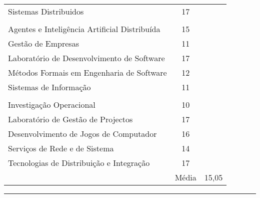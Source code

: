 \documentclass[a4paper,10pt]{article} %
\begin{document}
\begin{center}
\begin{tabular}{lcc}
Sistemas Distribuidos & 17\\ \\
Agentes e Inteligência Artificial Distribuída & 15\\
Gestão de Empresas & 11\\
Laboratório de Desenvolvimento de Software & 17\\
Métodos Formais em Engenharia de Software & 12\\
Sistemas de Informação & 11\\ \\
Investigação Operacional & 10\\
Laboratório de Gestão de Projectos & 17\\
Desenvolvimento de Jogos de Computador & 16\\
Serviços de Rede e de Sistema & 14\\
Tecnologias de Distribuição e Integração & 17\\														
& Média & 15,05 \\\cline{2-3}
\end{tabular}
\end{center}
\bigskip
\hrule
\bigskip

\end{document}
